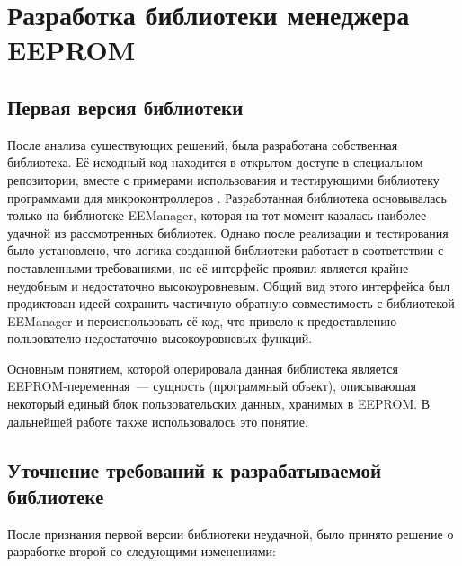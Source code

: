 \chapter{Разработка библиотеки менеджера EEPROM}

\section{Первая версия библиотеки}

После анализа существующих решений, была разработана собственная библиотека.
Её исходный код находится в открытом доступе в специальном репозитории, вместе с примерами использования и тестирующими библиотеку программами для микроконтроллеров \cite{web:my-eemanager}.
Разработанная библиотека основывалась только на библиотеке EEManager, которая на тот момент казалась наиболее удачной из рассмотренных библиотек.
Однако после реализации и тестирования было установлено, что логика созданной библиотеки работает в соответствии с поставленными требованиями, но её интерфейс проявил является крайне неудобным и недостаточно высокоуровневым.
Общий вид этого интерфейса был продиктован идеей сохранить частичную обратную совместимость с библиотекой EEManager и переиспользовать её код, что привело к предоставлению пользователю недостаточно высокоуровневых функций.

Основным понятием, которой оперировала данная библиотека является EEPROM-переменная~--- сущность (программный объект), описывающая некоторый единый блок пользовательских данных, хранимых в EEPROM.
В дальнейшей работе также использовалось это понятие.


\section{Уточнение требований к разрабатываемой библиотеке}

После признания первой версии библиотеки неудачной, было принято решение о разработке второй со следующими изменениями:

